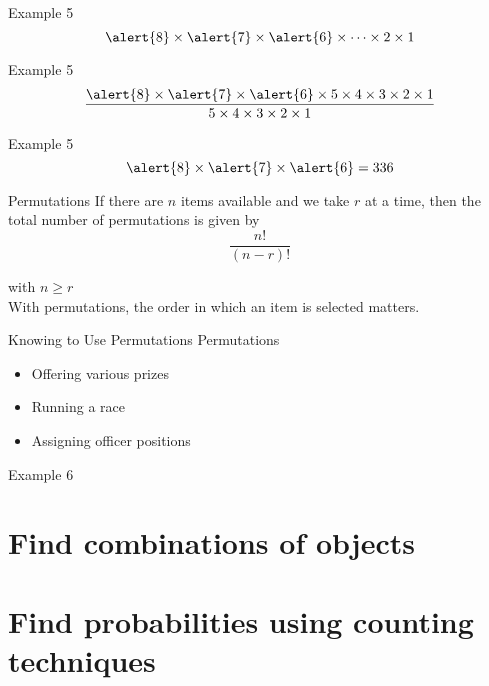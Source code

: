 \documentclass[t]{beamer}
\begin{document}
\begin{frame}{Example 5}
\[\alert{8} \times \alert{7} \times \alert{6} \times \dots \times 2 \times 1\]
\end{frame}

\begin{frame}{Example 5}
\[\frac{\alert{8} \times \alert{7} \times \alert{6} \times 5 \times 4 \times 3 \times 2 \times 1}{5 \times 4 \times 3 \times 2 \times 1}\]
\end{frame}

\begin{frame}{Example 5}
\[\alert{8} \times \alert{7} \times \alert{6} = 336\]
\end{frame}

\begin{frame}{Permutations}
If there are $n$ items available and we take $r$ at a time, then the total number of permutations is given by 
\[\frac{n!}{(n-r)!}\]

with $n \geq r$	\newline\\

\pause With permutations, the order in which an item is selected matters.
\end{frame}

\begin{frame}{Knowing to Use Permutations}
Permutations
\begin{itemize}
	\item<+-> Offering various prizes
	\item<+-> Running a race
	\item<+-> Assigning officer positions
\end{itemize}
\end{frame}

\begin{frame}{Example 6}

\end{frame}


\section{Find combinations of objects}
\section{Find probabilities using counting techniques}
\end{document}
